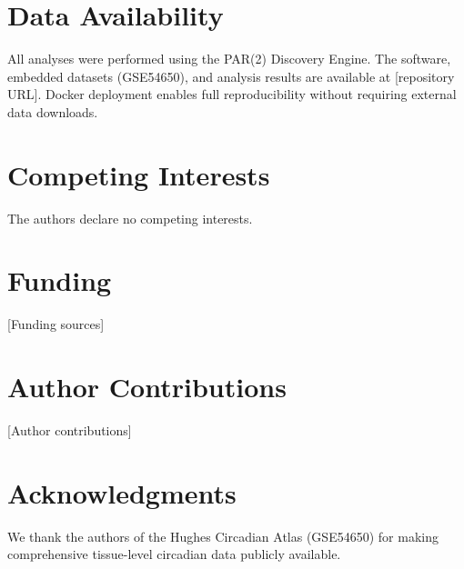 \documentclass[11pt,letterpaper]{article}
\begin{document}
\section*{Data Availability}

All analyses were performed using the PAR(2) Discovery Engine. The software, embedded datasets (GSE54650), and analysis results are available at [repository URL]. Docker deployment enables full reproducibility without requiring external data downloads.

\section*{Competing Interests}

The authors declare no competing interests.

\section*{Funding}

[Funding sources]

\section*{Author Contributions}

[Author contributions]

\section*{Acknowledgments}

We thank the authors of the Hughes Circadian Atlas (GSE54650) for making comprehensive tissue-level circadian data publicly available.
\end{document}
